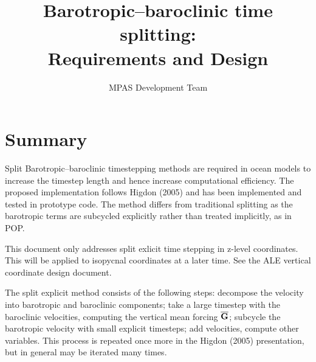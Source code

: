 \documentclass[11pt]{report}
\begin{document}
\title{Barotropic--baroclinic time splitting: \\
Requirements and Design}
\author{MPAS Development Team}
 
\maketitle
\tableofcontents


\chapter{Summary}




Split Barotropic--baroclinic timestepping methods are required in ocean
models to increase the timestep length and hence increase
computational efficiency.  The proposed implementation follows Higdon
(2005) and has been implemented and tested in prototype code.  The
method differs from traditional splitting as the barotropic terms are
subcycled explicitly rather than treated implicitly, as in POP.

This document only addresses split exlicit time stepping in z-level
coordinates.  This will be applied to isopycnal coordinates at a later
time.  See the ALE vertical coordinate design document.

The split explicit method consists of the following steps: decompose
the velocity into barotropic and baroclinic components; take a large
timestep with the baroclinic velocities, computing the vertical mean
forcing ${\overline {\bf G}}$; subcycle the barotropic velocity with
small explicit timesteps; add velocities, compute other variables.
This process is repeated once more in the Higdon (2005) presentation,
but in general may be iterated many times.
\end{document}
